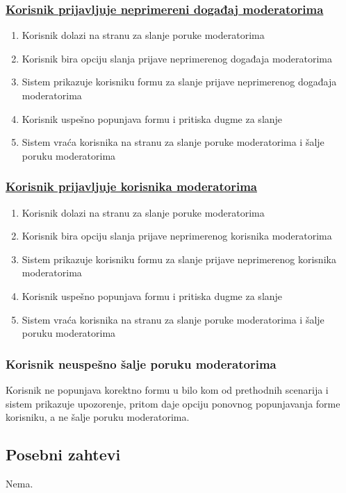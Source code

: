 \documentclass[11pt,a4paper]{article}
\begin{document}
\subsubsection{\underline{Korisnik prijavljuje neprimereni događaj moderatorima}}
\begin{enumerate}
    \item Korisnik dolazi na stranu za slanje poruke moderatorima
    \item Korisnik bira opciju slanja prijave neprimerenog događaja moderatorima
    \item Sistem prikazuje korisniku formu za slanje prijave neprimerenog događaja moderatorima
    \item Korisnik uspešno popunjava formu i pritiska dugme za slanje
    \item Sistem vraća korisnika na stranu za slanje poruke moderatorima i šalje poruku moderatorima
\end{enumerate}

\subsubsection{\underline{Korisnik prijavljuje korisnika moderatorima}}
\begin{enumerate}
    \item Korisnik dolazi na stranu za slanje poruke moderatorima
    \item Korisnik bira opciju slanja prijave neprimerenog korisnika moderatorima
    \item Sistem prikazuje korisniku formu za slanje prijave neprimerenog korisnika moderatorima
    \item Korisnik uspešno popunjava formu i pritiska dugme za slanje
    \item Sistem vraća korisnika na stranu za slanje poruke moderatorima i šalje poruku moderatorima
\end{enumerate}

\subsubsection{Korisnik neuspešno šalje poruku moderatorima}
Korisnik ne popunjava korektno formu u bilo kom od prethodnih scenarija i sistem prikazuje upozorenje, pritom daje opciju ponovnog popunjavanja forme korisniku, a ne šalje poruku moderatorima.

\subsection{Posebni zahtevi}
Nema.
\end{document}
